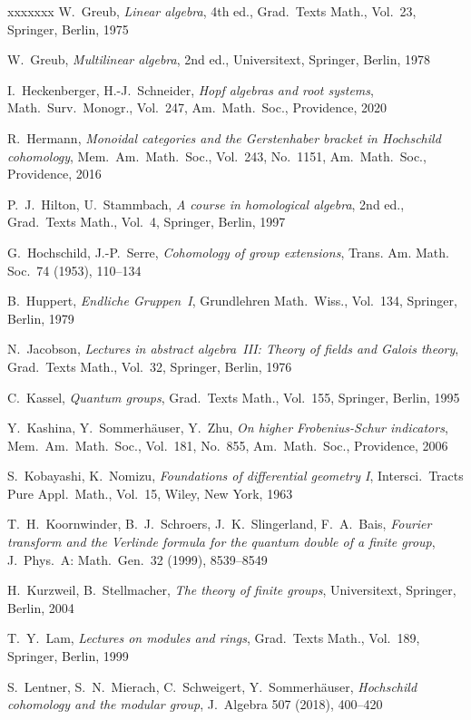 \documentclass[12pt]{article}
\theoremstyle{definition}
\theoremstyle{break}
\renewcommand{\1}{\mathbbm{1}}
\begin{document}
\begin{thebibliography}{xxxxxxx}
 W.~Greub,
\emph{Linear algebra},
4th ed., Grad.~Texts Math., Vol.~23, Springer, Berlin, 1975

 W.~Greub,
\emph{Multilinear algebra},
2nd ed., Universitext, Springer, Berlin, 1978

I.~Heckenberger, H.-J.~Schneider,
\emph{Hopf algebras and root systems}, 
Math.\ Surv.~Monogr., Vol.~247, Am.~Math.~Soc., Providence, 2020

R.~Hermann,
\emph{Monoidal categories and the Gerstenhaber bracket in Hoch\-schild cohomology},
Mem.\ Am.\ Math.~Soc., Vol.~243, No.~1151, Am.\ Math.\ Soc., Providence, 2016

P.~J.~Hilton, U.~Stammbach,
\emph{A course in homological algebra}, 2nd ed.,
Grad.~Texts Math., Vol.~4, Springer, Berlin, 1997

G.~Hochschild, J.-P.~Serre,
\emph{Cohomology of group extensions},
Trans. Am. Math. Soc.~74 (1953), 110--134

B.~Huppert,
\emph{Endliche Gruppen~I},
Grundlehren Math.\ Wiss., Vol.~134, Springer, Berlin, 1979

N.~Jacobson,
\emph{Lectures in abstract algebra~III: Theory of fields and Galois theory},
Grad.~Texts Math., Vol.~32, Springer, Berlin, 1976

C.~Kassel, 
\emph{Quantum groups},
Grad.~Texts Math., Vol.~155, Springer, Berlin, 1995

Y.~Kashina, Y.~Sommerh\"auser, Y.~Zhu,
\emph{On higher Frobenius-Schur indicators},
Mem.~Am.\ Math.~Soc., Vol.~181, No.~855, Am.~Math.~Soc., Providence, 2006

S.~Kobayashi, K.~Nomizu,
\emph{Foundations of differential geometry I},
Intersci.\ Tracts Pure Appl.\ Math., Vol.~15, Wiley, New York, 1963

T.~H.~Koornwinder, B.~J.~Schroers, J.~K.~Slingerland, F.~A.~Bais,
\emph{Fourier transform and the Verlinde formula for the quantum double of a finite group}, J.~Phys.~A: Math.~Gen.~32 (1999), 8539--8549

H.~Kurzweil, B.~Stellmacher,
\emph{The theory of finite groups},
Universitext, Springer, Berlin, 2004

T.~Y.~Lam,
\emph{Lectures on modules and rings},
Grad.~Texts Math., Vol.~189, Springer, Berlin, 1999

S.~Lentner, S.~N.~Mierach, C.~Schweigert, Y.~Sommerh\"auser,
\emph{Hochschild cohomology and the modular group},
J.~Algebra 507 (2018), 400--420


\end{thebibliography}
\end{document}
